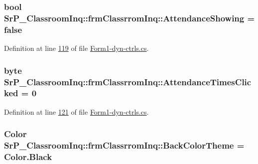 \hypertarget{class_sr_p___classroom_inq_1_1frm_classrrom_inq_a24415681575df1fd435d1b1da60dfde3}{
\subsubsection[{\-Attendance\-Showing}]{\setlength{\rightskip}{0pt plus 5cm}bool {\bf \-Sr\-P\-\_\-\-Classroom\-Inq\-::frm\-Classrrom\-Inq\-::\-Attendance\-Showing} = false}}
\label{class_sr_p___classroom_inq_1_1frm_classrrom_inq_a24415681575df1fd435d1b1da60dfde3}


\-Definition at line \hyperlink{_form1-dyn-ctrls_8cs_source_l00119}{119} of file \hyperlink{_form1-dyn-ctrls_8cs_source}{\-Form1-\/dyn-\/ctrls.\-cs}.

\hypertarget{class_sr_p___classroom_inq_1_1frm_classrrom_inq_ade18c1a241b76944c2731681e1767652}{
\subsubsection[{\-Attendance\-Times\-Clicked}]{\setlength{\rightskip}{0pt plus 5cm}byte {\bf \-Sr\-P\-\_\-\-Classroom\-Inq\-::frm\-Classrrom\-Inq\-::\-Attendance\-Times\-Clicked} = 0}}
\label{class_sr_p___classroom_inq_1_1frm_classrrom_inq_ade18c1a241b76944c2731681e1767652}


\-Definition at line \hyperlink{_form1-dyn-ctrls_8cs_source_l00121}{121} of file \hyperlink{_form1-dyn-ctrls_8cs_source}{\-Form1-\/dyn-\/ctrls.\-cs}.

\hypertarget{class_sr_p___classroom_inq_1_1frm_classrrom_inq_a29b5dc6ea05e60bb2577a5bef3532d7b}{
\subsubsection[{\-Back\-Color\-Theme}]{\setlength{\rightskip}{0pt plus 5cm}\-Color {\bf \-Sr\-P\-\_\-\-Classroom\-Inq\-::frm\-Classrrom\-Inq\-::\-Back\-Color\-Theme} = \-Color.\-Black}}
\label{class_sr_p___classroom_inq_1_1frm_classrrom_inq_a29b5dc6ea05e60bb2577a5bef3532d7b}


